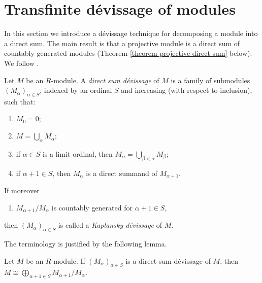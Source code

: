 \section{Transfinite d\'evissage of modules}
\label{section-transfinite-devissage}

\noindent
In this section we introduce a d\'evissage technique for decomposing a module
into a direct sum. The main result is that a projective module is a direct sum
of countably generated modules (Theorem \ref{theorem-projective-direct-sum}
below). We follow \cite{Kaplansky}.


\begin{definition}
\label{definition-devissage}
Let $M$ be an $R$-module.  A {\it direct sum d\'evissage} of $M$ is a family
of submodules $(M_{\alpha})_{\alpha \in S}$, indexed by an ordinal $S$ and
increasing (with respect to inclusion), such that:
\begin{enumerate}
\item[(0)] $M_0 = 0$;
\item[(1)] $M = \bigcup_{\alpha} M_{\alpha}$;
\item[(2)] if $\alpha \in S$ is a limit ordinal, then $M_{\alpha} =
\bigcup_{\beta < \alpha} M_{\beta}$;
\item[(3)] if $\alpha + 1 \in S$, then $M_{\alpha}$ is a direct summand of
$M_{\alpha + 1}$.
\end{enumerate}
If moreover
\begin{enumerate}
\item[(4)] $M_{\alpha + 1}/M_{\alpha}$ is countably generated for
$\alpha + 1 \in S$,
\end{enumerate}
then $(M_{\alpha})_{\alpha \in S}$ is called a {\it Kaplansky d\'evissage}
of $M$.
\end{definition}

\noindent
The terminology is justified by the following lemma.

\begin{lemma}
\label{lemma-direct-sum-devissage}
Let $M$ be an $R$-module.  If $(M_{\alpha})_{\alpha \in S}$ is a direct sum
d\'evissage of $M$, then
$M \cong \bigoplus_{\alpha + 1 \in S} M_{\alpha + 1}/M_{\alpha}$.
\end{lemma}

